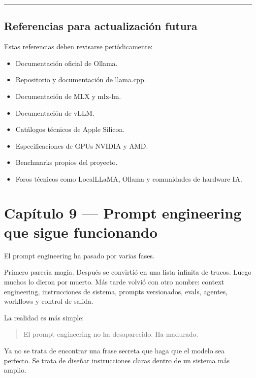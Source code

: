 \begin{center}\rule{0.5\linewidth}{0.5pt}\end{center}

\section{Referencias para actualización
futura}\label{referencias-para-actualizaciuxf3n-futura-1}

Estas referencias deben revisarse periódicamente:

\begin{itemize}
\tightlist
\item
  Documentación oficial de Ollama.
\item
  Repositorio y documentación de llama.cpp.
\item
  Documentación de MLX y mlx-lm.
\item
  Documentación de vLLM.
\item
  Catálogos técnicos de Apple Silicon.
\item
  Especificaciones de GPUs NVIDIA y AMD.
\item
  Benchmarks propios del proyecto.
\item
  Foros técnicos como LocalLLaMA, Ollama y comunidades de hardware IA.
\end{itemize}

\newpage

\chapter{Capítulo 9 --- Prompt engineering que sigue
funcionando}\label{capuxedtulo-9-prompt-engineering-que-sigue-funcionando}

El prompt engineering ha pasado por varias fases.

Primero parecía magia. Después se convirtió en una lista infinita de
trucos. Luego muchos lo dieron por muerto. Más tarde volvió con otro
nombre: context engineering, instrucciones de sistema, prompts
versionados, evals, agentes, workflows y control de salida.

La realidad es más simple:

\begin{quote}
El prompt engineering no ha desaparecido. Ha madurado.
\end{quote}

Ya no se trata de encontrar una frase secreta que haga que el modelo sea
perfecto. Se trata de diseñar instrucciones claras dentro de un sistema
más amplio.

